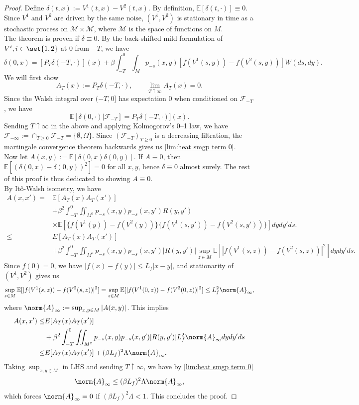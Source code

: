 \documentclass{article}
\numberwithin{theorem}{section}
\def\EE{\mathbb{E}} %
\def\mc{\mathcal}
\begin{document}
\begin{proof}
    Define $\delta(t,x):=V^1(t,x)-V^2(t,x)$. By definition, $\EE[\delta(t,\cdot)]\equiv0$. Since $V^1$ and $V^2$ are driven by the same noise, $(V^1,V^2)$ is stationary in time as a stochastic process on $\mathcal{M}\times\mathcal{M}$, where $\mathcal{M}$ is the space of functions on $M$.\\
    The theorem is proven if $\delta\equiv0$. By the back-shifted mild formulation of $V^i,i\in \set{1,2}$ at $0$ from $-T$, we have \[\label{eq:delta mild}\delta(0,x)=[P_{T}\delta(-T,\cdot)](x)+\beta\int_{-T}^0\int_M p_{-s}(x,y)[f(V^1(s,y))-f(V^2(s,y))]W(ds,dy).\]
    We will first show \begin{equation}\label{lim:heat smgp term 0}A_T(x):=P_{T}\delta(-T,\cdot),\qquad \lim_{T\uparrow\infty}A_T(x)=0.
    \end{equation}
    Since the Walsh integral over $(-T,0]$ has expectation 0 when conditioned on $\mathcal{F}_{-T}$, we have \[\EE[\delta(0,\cdot)|\mathcal{F}_{-T}]=P_{T}\delta(-T,\cdot)](x).\]
    Sending $T\uparrow\infty$ in the above and applying Kolmogorov's 0--1 law, we have \(\mc{F}_{-\infty}:=\cap_{T\geq 0}\mc{F}_{-T}=\{\emptyset,\Omega\}\). Since $(\mathcal F_{-T})_{T\ge0}$ is a decreasing filtration, the martingale convergence theorem backwards gives us \eqref{lim:heat smgp term 0}.\\
    Now let $A(x,y):=\EE[\delta(0,x)\delta(0,y)]$. If $A\equiv 0$, then \(\EE[(\delta(0,x)-\delta(0,y))^2]=0\) for all $x,y$, hence $\delta\equiv 0$ almost surely.
    The rest of this proof is thus dedicated to showing $A\equiv0$.\\
    By It\^o-Walsh isometry, we have \begin{align*}
        A(x,x')=&\EE[A_T(x)A_T(x')]\\
        &+\beta^2\int_{-T}^0\iint_{M^2} p_{-s}(x,y)p_{-s}(x,y')R(y,y')\\
        &\times\EE[\{f(V^1(y))-f(V^2(y))\}\{f(V^1(s,y'))-f(V^2(s,y'))\}]dydy'ds.\\
        \leq& E[A_T(x)A_T(x')]\\
        &+\beta^2\int_{-T}^0\iint_{M^2} p_{-s}(x,y)p_{-s}(x,y')|R(y,y')|\sup_{z\in M}\EE[|f(V^1(s,z))-f(V^2(s,z))|^2]dydy'ds.
    \end{align*}
    Since $f(0)=0$, we have $|f(x)-f(y)|\leq L_f|x-y|$, and stationarity of $(V^1,V^2)$ gives us \[\sup_{z\in M}\EE[|f(V^1(s,z))-f(V^2(s,z))|^2]=\sup_{z\in M}\EE[|f(V^1(0,z))-f(V^2(0,z))|^2]\leq L_f^2 \norm{A}_\infty,\] where \(\norm{A}_\infty:=\sup_{x,y\in M}|A(x,y)|\). This implies
    \begin{align*}
        A(x,x')\leq& E[A_T(x)A_T(x')]\\
        &+\beta^2\int_{-T}^0\iint_{M^2} p_{-s}(x,y)p_{-s}(x,y')|R(y,y')|L_f^2\norm{A}_{\infty}dydy'ds\\
        \leq& E[A_T(x)A_T(x')]+(\beta L_f)^2\Lambda\norm{A}_\infty.
    \end{align*}
    Taking $\sup_{x,y\in M}$ in LHS and sending $T\uparrow\infty$, we have by \eqref{lim:heat smgp term 0} \[\norm{A}_\infty\leq (\beta L_f)^2\Lambda\norm{A}_\infty,\]
    which forces $\norm{A}_\infty=0$ if $(\beta L_f)^2\Lambda<1$. This concludes the proof.
\end{proof}
\end{document}
